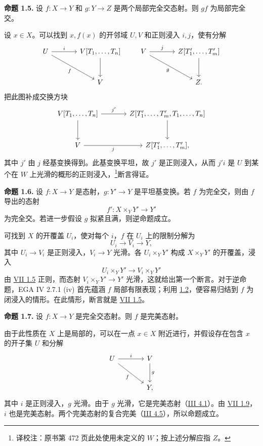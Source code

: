 \textbf{命题 1.5.} 设 $f:X\to Y$ 和 $g:Y\to Z$ 是两个局部完全交态射。则 $gf$ 为局部完全交。

设 $x\in X$。可以找到 $x,f(x)$ 的开邻域 $U,V$ 和正则浸入 $i,j$，使有分解
\[
\begin{tikzcd}[column sep=large,row sep=large]
U \arrow[r,"i"] \arrow[dr,"f"'] & V[T_1,\ldots,T_n] \arrow[d]\\
& V
\end{tikzcd}
\qquad
\begin{tikzcd}[column sep=large,row sep=large]
V \arrow[r,"j"] \arrow[dr,"g"'] & Z[T'_1,\ldots,T'_m] \arrow[d]\\
& Z.
\end{tikzcd}
\]
把此图补成交换方块
\[
\begin{tikzcd}[column sep=large,row sep=large]
V[T_1,\ldots,T_n] \arrow[r,"j'"] \arrow[d] & Z[T'_1,\ldots,T'_m,T_1,\ldots,T_n] \arrow[d]\\
V \arrow[r,"j"'] & Z[T'_1,\ldots,T'_m],
\end{tikzcd}
\]
其中 $j'$ 由 $j$ 经基变换得到。此基变换平坦，故 $j'$ 是正则浸入，从而 $j'i$ 是 $U$ 到某个在 $W$ 上光滑的概形的正则浸入，\footnote{译校注：原书第 472 页此处使用未定义的 $W$；按上述分解应指 $Z$。}断言得证。

\textbf{命题 1.6.} 设 $f:X\to Y$ 是态射，$g:Y'\to Y$ 是平坦基变换。若 $f$ 为完全交，则由 $f$ 导出的态射
\[
f':X\times_Y Y'\longrightarrow Y'
\]
为完全交。若进一步假设 $g$ 拟紧且满，则逆命题成立。

可找到 $X$ 的开覆盖 $U_i$，使对每个 $i$，$f$ 在 $U_i$ 上的限制分解为
\[
U_i\longrightarrow V_i\longrightarrow Y,
\]
其中 $U_i\to V_i$ 是正则浸入，$V_i\to Y$ 光滑。各 $U_i\times_Y Y'$ 构成 $X\times_Y Y'$ 的开覆盖，浸入
\[
U_i\times_Y Y'\longrightarrow V_i\times_Y Y'
\]
由 \hyperlink{sga6.e07.prop.1-5}{VII 1.5} 正则，而态射 $V_i\times_Y Y'\to Y'$ 光滑，这就给出第一个断言。对于逆命题，EGA IV 2.7.1 (iv) 首先蕴涵 $f$ 局部有限表现；利用 \hyperlink{sga6.e08.prop.1-2}{1.2}，便容易归结到 $f$ 为闭浸入的情形。在此情形，断言就是 \hyperlink{sga6.e07.prop.1-5}{VII 1.5}。

\textbf{命题 1.7.} 设 $f:X\to Y$ 是完全交态射。则 $f$ 是完美态射。

由于此性质在 $X$ 上是局部的，可以在一点 $x\in X$ 附近进行，并假设存在包含 $x$ 的开子集 $U$ 和分解
\[
\begin{tikzcd}[column sep=large,row sep=large]
U \arrow[r,"i"] \arrow[dr,"f"'] & V \arrow[d,"g"]\\
& Y,
\end{tikzcd}
\]
其中 $i$ 是正则浸入，$g$ 光滑。由于 $g$ 光滑，它是完美态射（\hyperlink{sga6.e03.def.4-1}{III 4.1}）。由 \hyperlink{sga6.e07.prop.1-9}{VII 1.9}，$i$ 也是完美态射。两个完美态射的复合完美（\hyperlink{sga6.e03.prop.4-5}{III 4.5}），所以命题成立。

